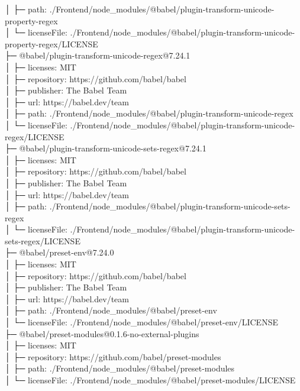 │  ├─ path: ./Frontend/node\_modules/@babel/plugin-transform-unicode-property-regex\\
│  └─ licenseFile: ./Frontend/node\_modules/@babel/plugin-transform-unicode-property-regex/LICENSE\\
├─ @babel/plugin-transform-unicode-regex@7.24.1\\
│  ├─ licenses: MIT\\
│  ├─ repository: https://github.com/babel/babel\\
│  ├─ publisher: The Babel Team\\
│  ├─ url: https://babel.dev/team\\
│  ├─ path: ./Frontend/node\_modules/@babel/plugin-transform-unicode-regex\\
│  └─ licenseFile: ./Frontend/node\_modules/@babel/plugin-transform-unicode-regex/LICENSE\\
├─ @babel/plugin-transform-unicode-sets-regex@7.24.1\\
│  ├─ licenses: MIT\\
│  ├─ repository: https://github.com/babel/babel\\
│  ├─ publisher: The Babel Team\\
│  ├─ url: https://babel.dev/team\\
│  ├─ path: ./Frontend/node\_modules/@babel/plugin-transform-unicode-sets-regex\\
│  └─ licenseFile: ./Frontend/node\_modules/@babel/plugin-transform-unicode-sets-regex/LICENSE\\
├─ @babel/preset-env@7.24.0\\
│  ├─ licenses: MIT\\
│  ├─ repository: https://github.com/babel/babel\\
│  ├─ publisher: The Babel Team\\
│  ├─ url: https://babel.dev/team\\
│  ├─ path: ./Frontend/node\_modules/@babel/preset-env\\
│  └─ licenseFile: ./Frontend/node\_modules/@babel/preset-env/LICENSE\\
├─ @babel/preset-modules@0.1.6-no-external-plugins\\
│  ├─ licenses: MIT\\
│  ├─ repository: https://github.com/babel/preset-modules\\
│  ├─ path: ./Frontend/node\_modules/@babel/preset-modules\\
│  └─ licenseFile: ./Frontend/node\_modules/@babel/preset-modules/LICENSE\\
